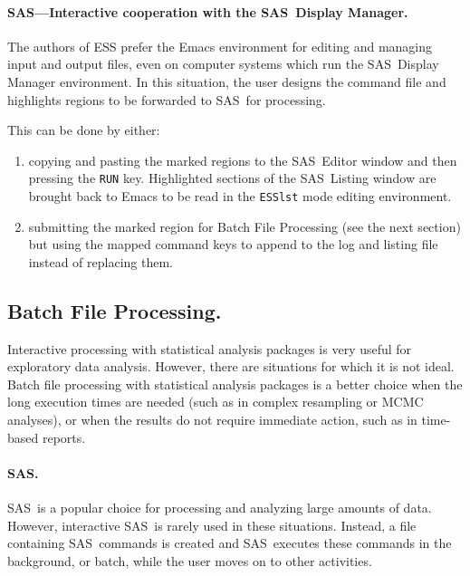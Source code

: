 \documentclass{article}
\newcommand*{\SAS}{\textsc{SAS}}
\newcommand{\stexttt}[1]{{\small\texttt{#1}}}
\begin{document}
\paragraph{\SAS---Interactive cooperation with the \SAS\ Display Manager.}

The authors of ESS prefer the Emacs environment for editing and
managing input and output files, even on computer systems which run
the \SAS\ Display Manager environment.  In this situation, the user
designs the command file and highlights regions to be forwarded to
\SAS\ for processing.

This can be done by either:
\begin{enumerate}
\item copying and pasting the marked regions to the \SAS\ Editor window
  and then pressing the \stexttt{RUN} key.  Highlighted sections of
  the \SAS\ Listing window are brought back to Emacs to be read in the
  \stexttt{ESSlst} mode editing environment.
\item submitting the marked region for Batch File Processing (see the
  next section) but using the mapped command keys to append to the log
  and listing file instead of replacing them.
\end{enumerate}

\subsection{Batch File Processing.}
\label{sec:batch-file}

Interactive processing with statistical analysis packages is very
useful for exploratory data analysis.%
However, there are %
situations for which it is not ideal.  Batch file processing with
statistical analysis packages is a better choice when the long
execution times are needed (such as in complex resampling or MCMC
analyses), or when the results do not require immediate action, such
as in time-based reports.

\paragraph{\SAS.}
\label{sec:sas-batch}

\SAS\ is a popular choice for processing and analyzing large amounts
of data.  However, interactive \SAS\ is rarely used in these
situations.  Instead, a file containing \SAS\ commands is created and
\SAS\ executes these commands in the background, or batch, while the
user moves on to other activities.
\end{document}
